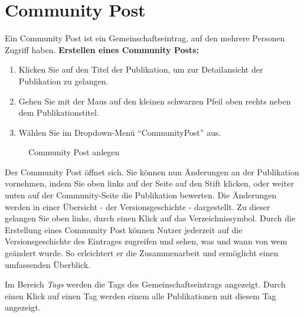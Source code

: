 \section{Community Post}
\label{sec:communityPost}
Ein Community Post ist ein Gemeinschaftseintrag, auf den mehrere Personen Zugriff haben. \newline \newline
\textbf{Erstellen eines Community Posts:}
\begin{enumerate}
	\item Klicken Sie auf den Titel der Publikation, um zur Detailansicht der Publikation zu gelangen. 
	\item Gehen Sie mit der Maus auf den kleinen schwarzen Pfeil oben rechts neben dem Publikationstitel. 
	\item Wählen Sie im Dropdown-Menü \enquote{CommunityPost} aus. \end{enumerate}
\begin{figure}[h!]
 \centering
 \caption{Community Post anlegen}
 \label{fig:communityPostAnlegen}
\end{figure}
Der Community Post öffnet sich. Sie können nun Änderungen an der Publikation vornehmen, indem Sie oben links auf der Seite auf den Stift klicken, oder weiter unten auf der Community-Seite die Publikation bewerten. Die Änderungen werden in einer Übersicht - der Versionsgeschichte - dargestellt. Zu dieser gelangen Sie oben links, durch einen Klick auf das Verzeichnissymbol.\newline
Durch die Erstellung eines Community Post können Nutzer jederzeit auf die Versionsgeschichte des Eintrages zugreifen und sehen, was und wann von wem geändert wurde. So erleichtert er die Zusammenarbeit und ermöglicht einen umfassenden Überblick. 

Im Bereich \textit{Tags} werden die Tags des Gemeinschaftseintrags angezeigt. Durch einen Klick auf einen Tag werden einem alle Publikationen mit diesem Tag angezeigt.

